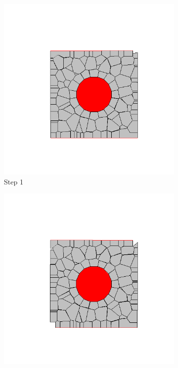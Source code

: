   \begin{figure}[ht!]
  \centering
      \begin{subfigure}{.25\textwidth}
        \centering
        \includegraphics[width=1.0\linewidth]{Files/Small_DEF/CR/DEP5-STEP(001).png}
      \caption{Step 1}
      \end{subfigure}%
      \begin{subfigure}{.25\textwidth}
        \centering
        \includegraphics[width=1.0\linewidth]{Files/Small_DEF/CR/DEP5-STEP(002).png}

\end{subfigure}
\end{figure}
